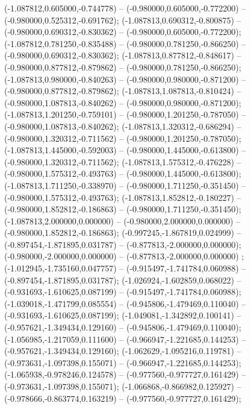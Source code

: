  (-1.087812,0.605000,-0.744778) -- (-0.980000,0.605000,-0.772200) -- (-0.980000,0.525312,-0.691762);
 (-1.087813,0.690312,-0.800875) -- (-0.980000,0.690312,-0.830362) -- (-0.980000,0.605000,-0.772200);
 (-1.087812,0.781250,-0.835488) -- (-0.980000,0.781250,-0.866250) -- (-0.980000,0.690312,-0.830362);
 (-1.087813,0.877812,-0.848617) -- (-0.980000,0.877812,-0.879862) -- (-0.980000,0.781250,-0.866250);
 (-1.087813,0.980000,-0.840263) -- (-0.980000,0.980000,-0.871200) -- (-0.980000,0.877812,-0.879862);
 (-1.087813,1.087813,-0.810424) -- (-0.980000,1.087813,-0.840262) -- (-0.980000,0.980000,-0.871200);
 (-1.087813,1.201250,-0.759101) -- (-0.980000,1.201250,-0.787050) -- (-0.980000,1.087813,-0.840262);
 (-1.087813,1.320312,-0.686294) -- (-0.980000,1.320312,-0.711562) -- (-0.980000,1.201250,-0.787050);
 (-1.087813,1.445000,-0.592003) -- (-0.980000,1.445000,-0.613800) -- (-0.980000,1.320312,-0.711562);
 (-1.087813,1.575312,-0.476228) -- (-0.980000,1.575312,-0.493763) -- (-0.980000,1.445000,-0.613800);
 (-1.087813,1.711250,-0.338970) -- (-0.980000,1.711250,-0.351450) -- (-0.980000,1.575312,-0.493763);
 (-1.087813,1.852812,-0.180227) -- (-0.980000,1.852812,-0.186863) -- (-0.980000,1.711250,-0.351450);
 (-1.087813,2.000000,0.000000) -- (-0.980000,2.000000,0.000000) -- (-0.980000,1.852812,-0.186863);
 (-0.997245,-1.867819,0.024999) -- (-0.897454,-1.871895,0.031787) -- (-0.877813,-2.000000,0.000000);
 (-0.980000,-2.000000,0.000000) -- (-0.877813,-2.000000,0.000000) ;
 (-1.012945,-1.735160,0.047757) -- (-0.915497,-1.741784,0.060988) -- (-0.897454,-1.871895,0.031787);
 (-1.026924,-1.602859,0.068022) -- (-0.931693,-1.610625,0.087199) -- (-0.915497,-1.741784,0.060988);
 (-1.039018,-1.471799,0.085554) -- (-0.945806,-1.479469,0.110040) -- (-0.931693,-1.610625,0.087199);
 (-1.049081,-1.342892,0.100141) -- (-0.957621,-1.349434,0.129160) -- (-0.945806,-1.479469,0.110040);
 (-1.056985,-1.217059,0.111600) -- (-0.966947,-1.221685,0.144253) -- (-0.957621,-1.349434,0.129160);
 (-1.062629,-1.095216,0.119781) -- (-0.973631,-1.097398,0.155071) -- (-0.966947,-1.221685,0.144253);
 (-1.065938,-0.978246,0.124578) -- (-0.977560,-0.977727,0.161429) -- (-0.973631,-1.097398,0.155071);
 (-1.066868,-0.866982,0.125927) -- (-0.978666,-0.863774,0.163219) -- (-0.977560,-0.977727,0.161429);
